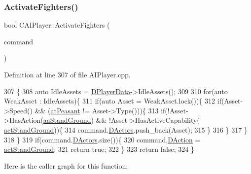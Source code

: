 \subsubsection{\texorpdfstring{Activate\+Fighters()}{ActivateFighters()}}
{\footnotesize\ttfamily bool C\+A\+I\+Player\+::\+Activate\+Fighters (\begin{DoxyParamCaption}\item[{\hyperlink{structSPlayerCommandRequest}{S\+Player\+Command\+Request} \&}]{command }\end{DoxyParamCaption})\hspace{0.3cm}{\ttfamily [protected]}}



Definition at line 307 of file A\+I\+Player.\+cpp.


\begin{DoxyCode}
307                                                               \{
308     \textcolor{keyword}{auto} IdleAssets = \hyperlink{classCAIPlayer_a83b5113c8f7e80df54940b647c5ee2e6}{DPlayerData}->IdleAssets();
309     
310     \textcolor{keywordflow}{for}(\textcolor{keyword}{auto} WeakAsset : IdleAssets)\{
311         \textcolor{keywordflow}{if}(\textcolor{keyword}{auto} Asset = WeakAsset.lock())\{
312             \textcolor{keywordflow}{if}(Asset->Speed() && (\hyperlink{GameDataTypes_8h_a5600d4fc433b83300308921974477fecaf5e570c7e5a2266810f610e7f945ea61}{atPeasant} != Asset->Type()))\{
313                 \textcolor{keywordflow}{if}(!Asset->HasAction(\hyperlink{GameDataTypes_8h_ab47668e651a3032cfb9c40ea2d60d670abd8a4e07a8f888148ed62ddd46719af3}{aaStandGround}) && !Asset->HasActiveCapability(
      \hyperlink{GameDataTypes_8h_a35b98ce26aca678b03c6f9f76e4778cea60ecb1b155c04190174a46d8053b5a04}{actStandGround}))\{
314                     command.\hyperlink{structSPlayerCommandRequest_aa37fc01519676345703d78b9f573894a}{DActors}.push\_back(Asset);
315                 \}
316             \}
317         \}
318     \}
319     \textcolor{keywordflow}{if}(command.\hyperlink{structSPlayerCommandRequest_aa37fc01519676345703d78b9f573894a}{DActors}.size())\{
320         command.\hyperlink{structSPlayerCommandRequest_a80897bbccf2c4e0b148a7aa815a926c6}{DAction} = \hyperlink{GameDataTypes_8h_a35b98ce26aca678b03c6f9f76e4778cea60ecb1b155c04190174a46d8053b5a04}{actStandGround};
321         \textcolor{keywordflow}{return} \textcolor{keyword}{true};
322     \}
323     \textcolor{keywordflow}{return} \textcolor{keyword}{false};
324 \}
\end{DoxyCode}
Here is the caller graph for this function\+:\nopagebreak
